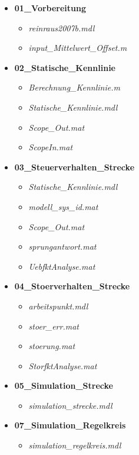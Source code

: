 \documentclass[11pt, a4paper,parskip=half]{article}
\begin{document}
\begin{itemize}
\item \textbf{01\_Vorbereitung}
	\begin{itemize}
	\item \textit{reinraus2007b.mdl}
	\item \textit{input\_Mittelwert\_Offset.m}
	\end{itemize}
	
\item \textbf{02\_Statische\_Kennlinie}
	\begin{itemize}
	\item \textit{Berechnung\_Kennlinie.m}
	\item \textit{Statische\_Kennlinie.mdl}
	\item \textit{Scope\_Out.mat}
	\item \textit{ScopeIn.mat}
	\end{itemize}
	
\item \textbf{03\_Steuerverhalten\_Strecke}
	\begin{itemize}
	\item \textit{Statische\_Kennlinie.mdl}
	\item \textit{modell\_sys\_id.mat}
	\item \textit{Scope\_Out.mat}
	\item \textit{sprungantwort.mat}
	\item \textit{UebfktAnalyse.mat}
	\end{itemize}
	
\item \textbf{04\_Stoerverhalten\_Strecke}
	\begin{itemize}
	\item \textit{arbeitspunkt.mdl}
	\item \textit{stoer\_err.mat}
	\item \textit{stoerung.mat}
	\item \textit{StorfktAnalyse.mat}
	\end{itemize}
	
\item \textbf{05\_Simulation\_Strecke}
	\begin{itemize}
	\item \textit{simulation\_strecke.mdl}
	\end{itemize}
	
\item \textbf{07\_Simulation\_Regelkreis}
	\begin{itemize}
	\item \textit{simulation\_regelkreis.mdl}
	\end{itemize}
	

\end{itemize}
\end{document}
